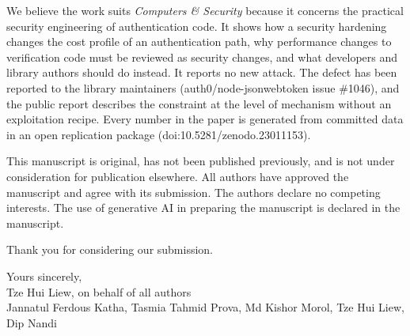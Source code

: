 \documentclass[11pt,a4paper]{article}
\begin{document}
We believe the work suits \emph{Computers \& Security} because it concerns
the practical security engineering of authentication code. It shows how a
security hardening changes the cost profile of an authentication path, why
performance changes to verification code must be reviewed as security changes,
and what developers and library authors should do instead. It reports no new
attack. The defect has been reported to the library maintainers
(auth0/node-jsonwebtoken issue \#1046), and the public report describes the
constraint at the level of mechanism without an exploitation recipe. Every
number in the paper is generated from committed data in an open replication
package (doi:10.5281/zenodo.23011153).

This manuscript is original, has not been published previously, and is not
under consideration for publication elsewhere. All authors have approved the
manuscript and agree with its submission. The authors declare no competing
interests. The use of generative AI in preparing the manuscript is declared in
the manuscript.

Thank you for considering our submission.

\medskip
\noindent
Yours sincerely,\\[4pt]
Tze Hui Liew, on behalf of all authors\\
Jannatul Ferdous Katha, Tasmia Tahmid Prova, Md Kishor Morol, Tze Hui Liew,
Dip Nandi
\end{document}
